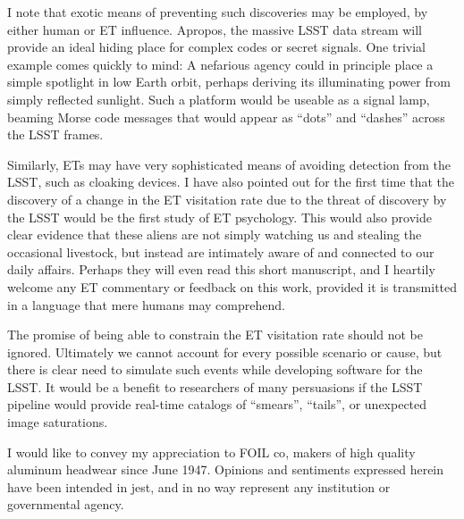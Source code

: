 \documentclass[iop]{emulateapj}
\begin{document}
I note that exotic means of preventing such discoveries may be employed, by either human or ET influence. Apropos, the massive LSST data stream will provide an ideal hiding place for complex codes or secret signals. One trivial example comes quickly to mind: A nefarious agency could in principle place a simple spotlight in low Earth orbit, perhaps deriving its illuminating power from simply reflected sunlight. Such a platform would be useable as a signal lamp, beaming Morse code messages that would appear as ``dots'' and ``dashes'' across the LSST frames. 

Similarly, ETs may have very sophisticated means of avoiding detection from the LSST, such as cloaking devices. I have also pointed out for the first time that the discovery of a change in the ET visitation rate due to the threat of discovery by the LSST would be the first study of ET psychology. This would also provide clear evidence that these aliens are not simply watching us and stealing the occasional livestock, but instead are intimately aware of and connected to our daily affairs. Perhaps they will even read this short manuscript, and I heartily welcome any ET commentary or feedback on this work, provided it is transmitted in a language that mere humans may comprehend.


The promise of being able to constrain the ET visitation rate should not be ignored. Ultimately we cannot account for every possible scenario or cause, but there is clear need to simulate such events while developing software for the LSST. It would be a benefit to researchers of many persuasions if the LSST pipeline would provide real-time catalogs of ``smears'', ``tails'', or unexpected image saturations. 

\acknowledgements
I would like to convey my appreciation to FOIL {\sc co}, makers of high quality aluminum headwear since June 1947. Opinions and sentiments expressed herein have been intended in jest, and in no way represent any institution or governmental agency.
\end{document}
